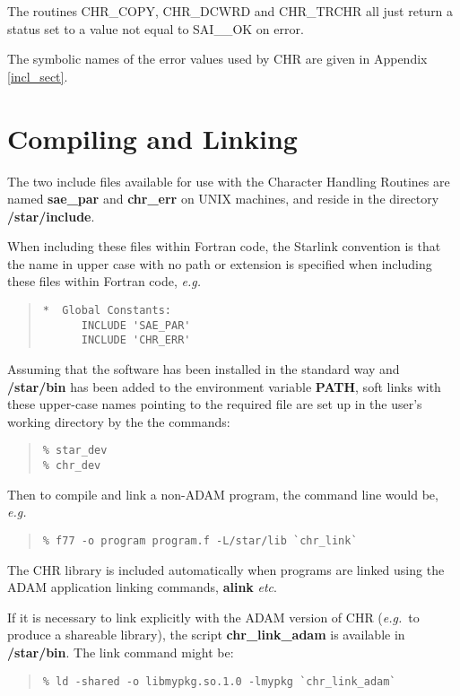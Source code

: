 The routines CHR\_COPY, CHR\_DCWRD and CHR\_TRCHR all just return a status
set to a value not equal to SAI\_\_OK on error.

The symbolic names of the error values used by CHR are given in Appendix
\ref{incl_sect}.


\section {Compiling and Linking \label{compile_sect}}
The two include files available for use with the Character Handling Routines 
are named {\bf sae\_par} and {\bf chr\_err} on UNIX
machines, and reside in the directory {\bf /star/include}.

When including these files within Fortran code, the Starlink convention
is that the name in upper case with no path or extension is specified when 
including these files within Fortran code, 
{\em e.g.}
\begin{quote}
\begin{small}
\begin{verbatim}
*  Global Constants:
      INCLUDE 'SAE_PAR'
      INCLUDE 'CHR_ERR'
\end{verbatim}
\end{small}
\end{quote}
Assuming that the software has been installed in the standard way and
{\bf /star/bin} has been added to the environment variable
{\bf PATH}, soft links with these upper-case names pointing to the required 
file are set up in the user's working directory by the the commands:
\begin {quote}
\begin{small}
\begin{verbatim}
% star_dev
% chr_dev
\end{verbatim}
\end{small}
\end {quote}
Then to compile and link a non-ADAM program, the command line would be, 
{\em e.g.}
\begin {quote}
\begin{verbatim}
% f77 -o program program.f -L/star/lib `chr_link`
\end{verbatim}
\end {quote}
The CHR library is included automatically when programs are linked using the
ADAM application linking commands, {\bf alink} {\em etc}.

If it is necessary to link explicitly with the ADAM version of CHR 
({\em e.g.}\ to produce a shareable library), the 
script {\bf chr\_link\_adam} is available in {\bf /star/bin}. 
The link command might be:
\begin {quote}
\begin {small}
\begin{verbatim}
% ld -shared -o libmypkg.so.1.0 -lmypkg `chr_link_adam`
\end{verbatim}
\end {small}
\end {quote}

